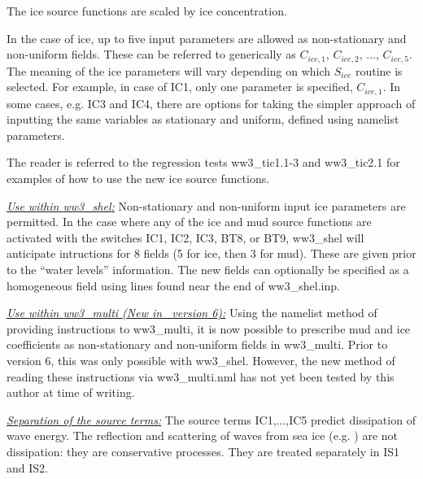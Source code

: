 The ice source functions are scaled by ice concentration.

In the case of ice, up to five input parameters are allowed as 
non-stationary and non-uniform fields. These can be referred
to generically as ${C_{ice,1}}$, ${C_{ice,2}}$, ..., ${C_{ice,5}}$.  The meaning
of the ice parameters will vary depending on which ${S_{ice}}$ routine is
selected. For example, in case of {\code IC1}, only one parameter is specified, ${C_{ice,1}}$.
In some cases, e.g. {\code IC3} and {\code IC4}, there are options for taking the simpler approach
of inputting the same variables as stationary and uniform, defined using namelist parameters.

The reader is referred to the regression tests {\file ww3\_tic1.1-3} and
{\file ww3\_tic2.1} for examples of how to use the new ice source functions.

\textrm{\textit{\underline{Use within {\file ww3\_shel}:}}} 
Non-stationary and non-uniform input ice parameters are permitted.
In the case where any of the ice and mud source functions are activated with
the switches {\code IC1}, {\code IC2}, {\code IC3}, {\code BT8}, or {\code
BT9}, {\file ww3\_shel} will anticipate intructions for 8 fields (5 for ice,
then 3 for mud). These are given prior to the ``water levels'' information.
The new fields can optionally be specified as a homogeneous field using lines
found near the end of {\file ww3\_shel.inp}. 

\textrm{\textit{\underline{Use within {\file ww3\_multi} (New in \ws\ version 6):}}} Using the namelist method of
providing instructions to {\file ww3\_multi}, it is now possible to prescribe mud and ice coefficients as non-stationary and non-uniform fields in {\file ww3\_multi}. Prior to version 6, this was only possible with {\file ww3\_shel}. 
However, the new method of reading these instructions via {\file ww3\_multi.nml} has not yet been tested by this author at time of writing.

\textrm{\textit{\underline{Separation of the source terms:}}} 
The source terms {\code IC1},...,{\code IC5} predict dissipation of wave energy. The reflection and scattering of waves from sea ice  (e.g. \cite{art:Wad75}) are not dissipation: they are conservative processes. They are treated separately in {\code IS1} and {\code IS2}.
